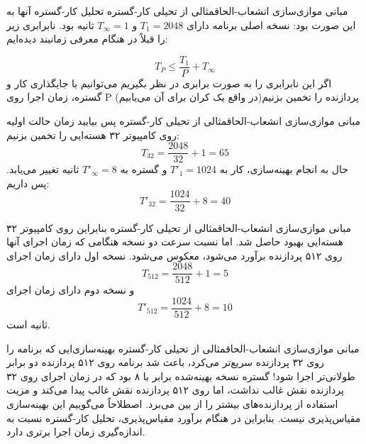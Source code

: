 \begin{itemframe-s}{مبانی موازی‌سازی انشعاب-الحاق}{مثالی از تحیلی کار-گستره}
\itm
تحلیل کار-گستره آنها به این صورت بود: نسخه اصلی برنامه دارای
$T_1 = 2048 $
و
$T_\infty = 1$
ثانیه بود.
\itm
نابرابری زیر را قبلاً در هنگام معرفی زمانبند دیده‌ایم:

$$T_P \le \frac{T_1}{P} + T_\infty$$
\itm
اگر این  نابرابری را به صورت برابری در نظر بگیریم می‌توانیم با جایگذاری کار و گستره، زمان اجرا روی P پردازنده را تخمین بزنیم(در واقع یک کران برای آن می‌یابیم)

\end{itemframe-s}


\begin{itemframe-s}{مبانی موازی‌سازی انشعاب-الحاق}{مثالی از تحیلی کار-گستره}
\itm
پس بیایید زمان حالت اولیه روی کامپیوتر ۳۲ هسته‌ایی را تخمین بزنیم:
$$
T_{32} = \frac{2048}{32} + 1 = 65
$$
\itm
حال به انجام بهینه‌سازی، کار به
$T'_1 = 1024$
و گستره به
$T'_\infty = 8$
ثانیه تغییر می‌یابد. پس داریم:
$$
T'_{32} = \frac{1024}{32} + 8 = 40
$$
\end{itemframe-s}



\begin{itemframe-s}{مبانی موازی‌سازی انشعاب-الحاق}{مثالی از تحیلی کار-گستره}
\itm
بنابراین روی کامپیوتر ۳۲ هسته‌ایی بهبود حاصل شد. اما نسبت سرعت دو نسخه هنگامی که زمان اجرای آنها روی ۵۱۲ پردازنده برآورد می‌شود، معکوس می‌شود. نسخه اول دارای زمان اجرای
$$
T_{512} = \frac{2048}{512} + 1 = 5
$$
و نسخه دوم دارای زمان اجرای
$$
T'_{512} = \frac{1024}{512} + 8 = 10
$$
ثانیه است.
\end{itemframe-s}


\begin{itemframe-s}{مبانی موازی‌سازی انشعاب-الحاق}{مثالی از تحیلی کار-گستره}
\itm
بهینه‌سازی‌ایی که برنامه را روی ۳۲ پردازنده سریع‌تر می‌کرد، باعث شد برنامه روی ۵۱۲ پردازنده دو برابر طولانی‌تر اجرا شود!
\itm
گستره نسخه بهینه‌شده برابر با ۸ بود که در زمان اجرای روی ۳۲ پردازنده نقش غالب نداشت، اما روی ۵۱۲ پردازنده نقش غالب پیدا می‌کند و مزیت استفاده از پردازنده‌های بیشتر را از بین می‌برد. اصطلاحاً می‌گوییم این بهینه‌سازی مقیاس‌پذیری نیست.
\itm
بنابراین در هنگام برآورد مقیاس‌پذیری، تحلیل کار-گستره نسبت به اندازه‌گیری زمان اجرا برتری دارد.
\end{itemframe-s}